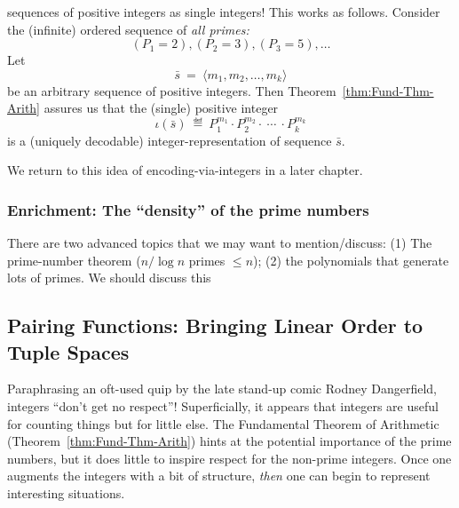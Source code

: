 sequences of positive integers as single integers!  This works as
follows.  Consider the (infinite) ordered sequence of {\em all primes:}
\[ (P_1 = 2), (P_2 = 3), (P_3 = 5), \ldots  \]
Let
\begin{equation}
\label{eq:sequence-vec-s}
\bar{s} \ = \ \langle m_1, m_2, \ldots, m_k \rangle
\end{equation}
be an arbitrary sequence of positive integers.  Then
Theorem~\ref{thm:Fund-Thm-Arith} assures us that the (single) positive
integer
\[ 
\iota(\bar{s}) \ \eqdef \ P_1^{m_1} \cdot P_2^{m_2} \cdot \ \cdots \
\cdot P_k^{m_k}
\]
is a (uniquely decodable) integer-representation of sequence $\bar{s}$.

We return to this idea of encoding-via-integers in a later chapter.

\subsubsection{Enrichment: The ``density'' of the prime numbers}
\label{sec:Prime-Number-Theorem}

{\Arny There are two advanced topics that we may want to
  mention/discuss: (1) The prime-number theorem ($n/ \log n$ primes
  $\leq n$); (2) the polynomials that generate lots of primes.  We
  should discuss this}


\subsection{Pairing Functions: Bringing Linear Order to Tuple Spaces}
\label{sec:pairing}

Paraphrasing an oft-used quip by the late stand-up comic Rodney
Dangerfield, integers ``don't get no respect''!  Superficially, it
appears that integers are useful for counting things but for little
else.  The Fundamental Theorem of Arithmetic
(Theorem~\ref{thm:Fund-Thm-Arith}) hints at the potential importance
of the prime numbers, but it does little to inspire respect for the
non-prime integers.  Once one augments the integers with a bit of
structure, {\em then} one can begin to represent interesting
situations.

